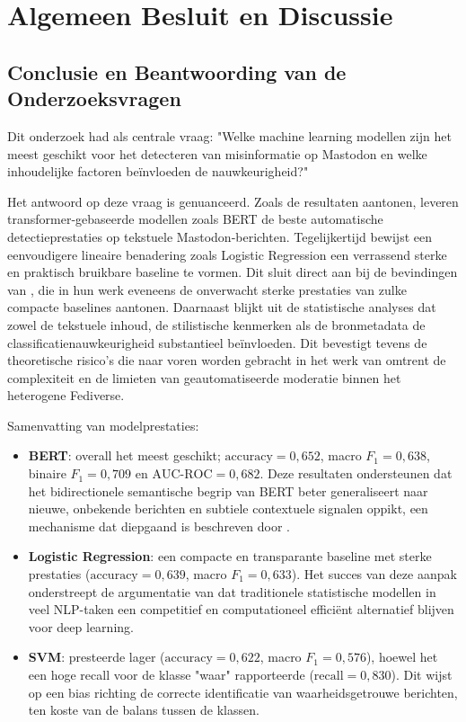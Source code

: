 \chapter{Algemeen Besluit en Discussie}
\label{cha:algemeen_besluit}

\section{Conclusie en Beantwoording van de Onderzoeksvragen}
Dit onderzoek had als centrale vraag: "Welke machine learning modellen zijn het meest geschikt voor het detecteren van misinformatie op Mastodon en welke inhoudelijke factoren beïnvloeden de nauwkeurigheid?"

Het antwoord op deze vraag is genuanceerd. Zoals de resultaten aantonen, leveren transformer‑gebaseerde modellen zoals BERT de beste automatische detectieprestaties op tekstuele Mastodon‑berichten. Tegelijkertijd bewijst een eenvoudigere lineaire benadering zoals Logistic Regression een verrassend sterke en praktisch bruikbare baseline te vormen. Dit sluit direct aan bij de bevindingen van \textcite{pelrine2021surprising}, die in hun werk eveneens de onverwacht sterke prestaties van zulke compacte baselines aantonen. Daarnaast blijkt uit de statistische analyses dat zowel de tekstuele inhoud, de stilistische kenmerken als de bronmetadata de classificatienauwkeurigheid substantieel beïnvloeden. Dit bevestigt tevens de theoretische risico's die naar voren worden gebracht in het werk van \textcite{Zia2025} omtrent de complexiteit en de limieten van geautomatiseerde moderatie binnen het heterogene Fediverse.

Samenvatting van modelprestaties:
\begin{itemize}
  \item \textbf{BERT}: overall het meest geschikt; $\text{accuracy} = 0{,}652$, macro $F_1 = 0{,}638$, binaire $F_1 = 0{,}709$ en $\text{AUC‑ROC} = 0{,}682$. Deze resultaten ondersteunen dat het bidirectionele semantische begrip van BERT beter generaliseert naar nieuwe, onbekende berichten en subtiele contextuele signalen oppikt, een mechanisme dat diepgaand is beschreven door \textcite{Devlin2019}.
  \item \textbf{Logistic Regression}: een compacte en transparante baseline met sterke prestaties ($\text{accuracy} = 0{,}639$, macro $F_1 = 0{,}633$). Het succes van deze aanpak onderstreept de argumentatie van \textcite{pelrine2021surprising} dat traditionele statistische modellen in veel NLP-taken een competitief en computationeel efficiënt alternatief blijven voor deep learning.
  \item \textbf{SVM}: presteerde lager ($\text{accuracy} = 0{,}622$, macro $F_1 = 0{,}576$), hoewel het een hoge recall voor de klasse "waar" rapporteerde ($\text{recall} = 0{,}830$). Dit wijst op een bias richting de correcte identificatie van waarheidsgetrouwe berichten, ten koste van de balans tussen de klassen.
\end{itemize}

